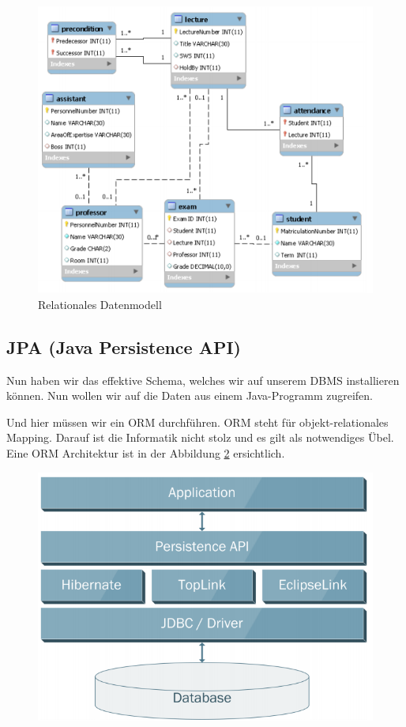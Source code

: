 \begin{figure}[h!]
\centering
\includegraphics[width=0.7\linewidth]{fig/relationales-datenmodell}
\caption{Relationales Datenmodell}
\label{fig:relationales-datenmodell}
\end{figure}

\subsection{JPA (Java Persistence API)}
Nun haben wir das effektive Schema, welches wir auf unserem DBMS installieren können. Nun wollen wir auf die Daten aus einem Java-Programm zugreifen.

Und hier müssen wir ein ORM durchführen. ORM steht für objekt-relationales Mapping. Darauf ist die Informatik nicht stolz und es gilt als notwendiges Übel. Eine ORM Architektur ist in der Abbildung \ref{fig:orm-basics} ersichtlich.

\begin{figure}[h!]
\centering
\includegraphics[width=0.7\linewidth]{fig/orm-basics}
\caption[ORM Basics]{}
\caption{}
\label{fig:orm-basics}
\end{figure}

